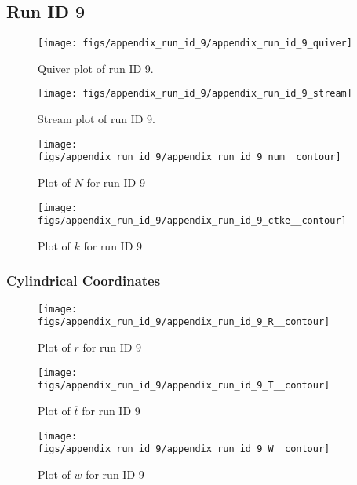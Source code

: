 \subsection{Run ID 9}
\begin{figure}[H]
\centering
\texttt{[image: figs/appendix\_run\_id\_9/appendix\_run\_id\_9\_quiver]}
\caption{Quiver plot of run ID 9.}
\label{fig:appendix_run_id_9_quiver}
\end{figure}


\begin{figure}[H]
\centering
\texttt{[image: figs/appendix\_run\_id\_9/appendix\_run\_id\_9\_stream]}
\caption{Stream plot of run ID 9.}
\label{fig:appendix_run_id_9_stream}
\end{figure}


\begin{figure}[H]
\centering
\texttt{[image: figs/appendix\_run\_id\_9/appendix\_run\_id\_9\_num\_\_contour]}
\caption{Plot of $N$ for run ID 9}
\label{fig:appendix_run_id_9_num__contour}
\end{figure}


\begin{figure}[H]
\centering
\texttt{[image: figs/appendix\_run\_id\_9/appendix\_run\_id\_9\_ctke\_\_contour]}
\caption{Plot of $k$ for run ID 9}
\label{fig:appendix_run_id_9_ctke__contour}
\end{figure}


\subsubsection{Cylindrical Coordinates}
\begin{figure}[H]
\centering
\texttt{[image: figs/appendix\_run\_id\_9/appendix\_run\_id\_9\_R\_\_contour]}
\caption{Plot of $\overline{r}$ for run ID 9}
\label{fig:appendix_run_id_9_R__contour}
\end{figure}


\begin{figure}[H]
\centering
\texttt{[image: figs/appendix\_run\_id\_9/appendix\_run\_id\_9\_T\_\_contour]}
\caption{Plot of $\overline{t}$ for run ID 9}
\label{fig:appendix_run_id_9_T__contour}
\end{figure}


\begin{figure}[H]
\centering
\texttt{[image: figs/appendix\_run\_id\_9/appendix\_run\_id\_9\_W\_\_contour]}
\caption{Plot of $\overline{w}$ for run ID 9}
\label{fig:appendix_run_id_9_W__contour}
\end{figure}



